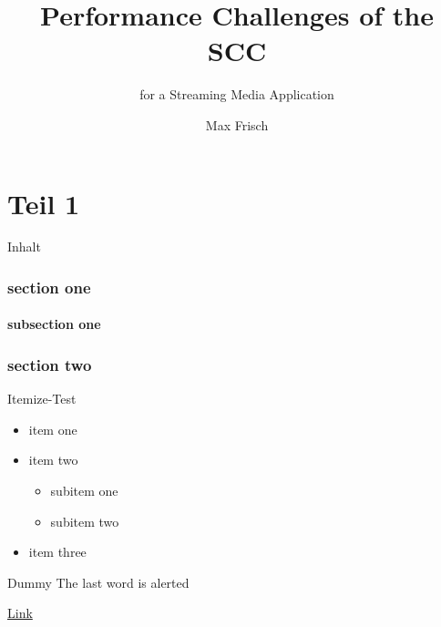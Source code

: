 \documentclass{beamer}
\begin{document}
\title{Performance Challenges of the SCC}
\subtitle{for a Streaming Media Application}
\author{Max Frisch}


\begin{frame}[plain]
  \titlepage
\end{frame}


\part{Teil 1}

\begin{frame}
  \partpage
\end{frame}


\begin{frame}{Inhalt}
  \tableofcontents
\end{frame}

\section{section one}
\subsection{subsection one}
\section{section two}

\begin{frame}{Itemize-Test}
  \begin{itemize}
    \item item one
    \item item two
    \begin{itemize}
      \item subitem one
      \item subitem two
    \end{itemize}
    \item item three
  \end{itemize}
\end{frame}


\begin{frame}[highlight]{Dummy}
  The last word is \alert{alerted}\par
  \url{Link}
\end{frame}
\end{document}
